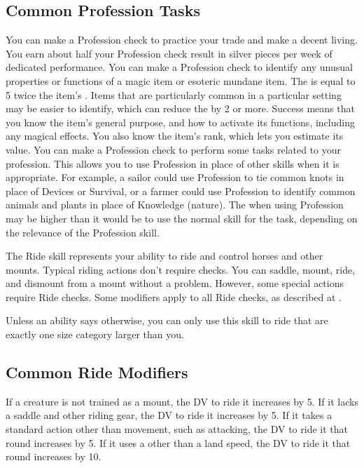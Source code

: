     \subsection{Common Profession Tasks}
         You can make a Profession check to practice your trade and make a decent living.
        You earn about half your Profession check result in silver pieces per week of dedicated performance.
         You can make a Profession check to identify any unusual properties or functions of a magic item or esoteric mundane item.
        The  is equal to 5 \add twice the item's .
        Items that are particularly common in a particular setting may be easier to identify, which can reduce the  by 2 or more.
        Success means that you know the item's general purpose, and how to activate its functions, including any magical effects.
        You also know the item's rank, which lets you estimate its value.
         You can make a Profession check to perform some tasks related to your profession.
        This allows you to use Profession in place of other skills when it is appropriate.
        For example, a sailor could use Profession to tie common knots in place of Devices or Survival, or a farmer could use Profession to identify common animals and plants in place of Knowledge (nature).
        The  when using Profession may be higher than it would be to use the normal skill for the task, depending on the relevance of the Profession skill.

\newpage
{}
    The Ride skill represents your ability to ride and control horses and other mounts.
    Typical riding actions don't require checks. You can saddle, mount, ride, and dismount from a mount without a problem. However, some special actions require Ride checks. Some modifiers apply to all Ride checks, as described at .

    Unless an ability says otherwise, you can only use this skill to ride  that are exactly one size category larger than you.

    \subsection{Common Ride Modifiers}\label{Common Ride Modifiers}
        If a creature is not trained as a mount, the DV to ride it increases by 5.
        If it lacks a saddle and other riding gear, the DV to ride it increases by 5.
        If it takes a standard action other than movement, such as attacking, the DV to ride it that round increases by 5.
        If it uses a  other than a land speed, the DV to ride it that round increases by 10.

